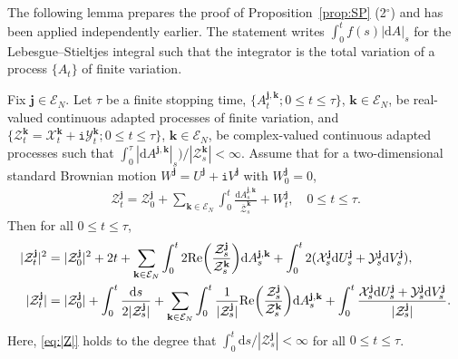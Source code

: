 \documentclass[12pt, twoside]{article}
\numberwithin{figure}{section}
\renewcommand{\Re}{{\rm Re}}
\newcommand{\1}{\mathds 1}
\newcommand{\mc}{\mathcal}
\renewcommand{\d}{{\mathrm d}}
\newcommand{\2}{{\mathbf 1}}
\renewcommand{\i}{{\mathtt i}}
\newcommand{\cc}{{^\circ}}
\newcommand{\bj}{\mathbf j}
\newcommand{\bk}{\mathbf k}
\begin{document}
The following lemma prepares the proof of Proposition~\ref{prop:SP} (2$\cc$) and has been applied independently earlier. The statement writes $\int_0^t f(s)|\d A|_s$ for the Lebesgue--Stieltjes integral such that the integrator is the total variation of a process $\{A_t\}$ of finite variation. 

\begin{lem}\label{lem:SQ}
Fix $\bj\in \mc E_N$.
Let $\tau$ be a finite stopping time, $\{A^{\bj,\bk}_t;0\leq t\leq \tau\}$, $\bk\in \mc E_N$, be real-valued continuous adapted processes of finite variation, and $\{\mathcal Z^\bk_t=\mathcal X^\bk_t+\i\mathcal Y^{\bk}_t;0\leq t\leq \tau\}$, $\bk\in\mathcal E_N$, be complex-valued continuous adapted processes such that 
 $\int_0^\tau  |\d A^{\bj,\bk}|_s)/|\mathcal Z^\bk_s|<\infty$. Assume that for a two-dimensional standard Brownian motion $W^\bj=U^\bj+\i V^\bj$ with $W^\bj_0=0$, 
\begin{align}\label{def:Zbi}
\mathcal Z^\bj_t=\mathcal Z^\bj_0+\sum_{\bk\in \mathcal E_N}\int_0^t\frac{\d A^{\bj,\bk}_s}{\overline{\mathcal Z}^\bk_s}+W^\bj_t,\quad 0\leq t\leq \tau.
\end{align}
Then for all $0\leq t\leq \tau$,
\begin{align}
|\mathcal Z^\bj_t|^2&=|\mathcal Z^\bj_0|^2+2t+\sum_{\bk\in \mathcal E_N}\int_0^t2\Re\biggl(\frac{\mathcal Z^\bj_s}{\mathcal Z^\bk_s}\biggr)\d A^{\bj,\bk}_s+\int_0^t 2(\mathcal X^\bj_s\d U^\bj_s+\mathcal Y^\bj_s\d V^\bj_s),\label{eq:|Z|2}\\
|\mathcal Z^\bj_t|&=|\mathcal Z^\bj_0|+\int_0^t \frac{\d s}{2|\mathcal Z^\bj_s|}+\sum_{\bk\in \mathcal E_N}\int_0^t\frac{1}{|\mathcal Z^\bj_s|}\Re\biggl(\frac{\mathcal Z^\bj_s}{\mathcal Z^\bk_s}\biggr)\d A^{\bj,\bk}_s+\int_0^t \frac{\mathcal X^\bj_s\d U^\bj_s+\mathcal Y^\bj_s\d V^\bj_s}{|\mathcal Z^\bj_s|}.\label{eq:|Z|}
\end{align}
Here, \eqref{eq:|Z|} holds to the degree that $\int_0^t \d s/|\mc Z^\bj_s|<\infty$ for all $0\leq t\leq \tau$. 
\end{lem}
\end{document}
